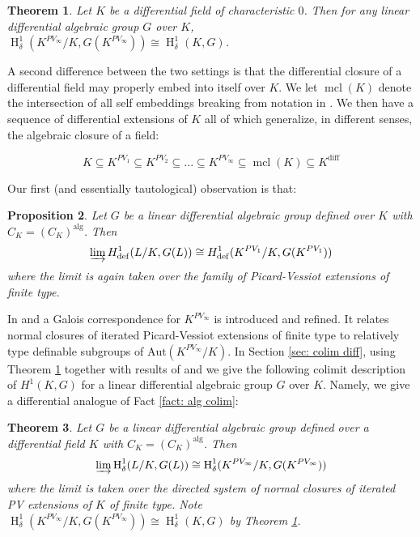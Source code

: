 \documentclass{amsart}
\newtheorem{theorem}{Theorem}[section]
\newtheorem{proposition}[theorem]{Proposition}
\theoremstyle{definition}
\theoremstyle{remark}
\numberwithin{equation}{section}
\def \defin {\operatorname{def}}
\def \HH {\operatorname{H}}
\def \diff {\operatorname{diff}}
\def \alg {\operatorname{alg}}
\def \aut {\text{Aut}}
\def \mcl {\operatorname{mcl}}
\begin{document}
\begin{theorem}\label{thm: diff triviality in PV}\cite{AnandDavidComm}
    Let $K$ be a differential field of characteristic $0$. Then for any linear differential algebraic group $G$ over $K$, 
    $\HH_{\delta}^{1}(K^{PV_\infty}/K,G(K^{PV_\infty})) \cong \HH_{\delta}^{1}(K,G)$.
\end{theorem}

A second difference between the two settings is that the differential closure of a differential field may properly embed into itself over $K$. We let $\mcl(K)$ denote the intersection of all self embeddings breaking from notation in \cite{meretzky2026galoistheoryautomorphismgroups}. We then have a sequence of differential extensions of $K$ all of which generalize, in different senses, the algebraic closure of a field:

$$K \subseteq K^{PV_1}\subseteq K^{PV_2} \subseteq ...\subseteq  K^{PV_\infty} \subseteq \mcl(K) \subseteq K^{\diff}$$

Our first (and essentially tautological) observation is that:

\begin{proposition}
    Let $G$ be a linear differential algebraic group defined over $K$ with $C_K = (C_K)^{\alg}$. Then $$\varinjlim H^1_{\defin}(L/K,G(L)) \cong H^1_{\defin}(K^{PV_1}/K,G(K^{PV_1}))$$ where the limit is again taken over the family of Picard-Vessiot extensions of finite type. 
\end{proposition}

In \cite{magid2022completepicardvessiotclosure} and  \cite{meretzky2026galoistheoryautomorphismgroups} a Galois correspondence for $K^{PV_\infty}$ is introduced and refined. It relates normal closures of iterated Picard-Vessiot extensions of finite type to relatively type definable subgroups of $\aut(K^{PV_\infty}/K)$. In Section \ref{sec: colim diff}, using Theorem \ref{thm: diff triviality in PV} together with results of \cite{magid2022completepicardvessiotclosure} and  \cite{meretzky2026galoistheoryautomorphismgroups} we give the following colimit description of $H^1(K,G)$ for a linear differential algebraic group $G$ over $K$. Namely, we give a differential analogue of Fact \ref{fact: alg colim}:

\begin{theorem}
    Let $G$ be a linear differential algebraic group defined over a differential field $K$ with $C_K = (C_K)^{\alg}$. Then $$\varinjlim\HH^1_{\delta}(L/K,G(L)) \cong \HH_{\delta}^{1}(K^{PV_\infty}/K,G(K^{PV_\infty}))$$ where the limit is taken over the directed system of normal closures of iterated PV extensions of $K$ of finite type. Note $\HH_{\delta}^{1}(K^{PV_\infty}/K,G(K^{PV_\infty}))\cong \HH^1_{\delta}(K,G)$ by Theorem \ref{thm: diff triviality in PV}.
\end{theorem}
\end{document}

